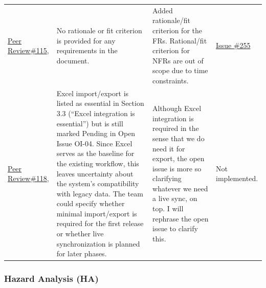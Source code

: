 \documentclass{article}
\begin{document}
\begin{longtable}{p{} p{}
                    p{} p{}}
    \href{https://github.com/thaafei/DomainX/issues/115}{Peer Review\#115},
    &
    No rationale or fit criterion is provided for any requirements in the document.
    &
    Added rationale/fit criterion for the FRs. Rational/fit criterion for NFRs are out of scope due to time constraints.
    &
    \href{https://github.com/thaafei/DomainX/issues/255}{Issue \#255} \\

    \href{https://github.com/thaafei/DomainX/issues/118}{Peer Review\#118},
    &
    Excel import/export is listed as essential in Section 3.3 (“Excel integration is essential”) but is still marked Pending in Open Issue OI-04. Since Excel serves as the baseline for the existing workflow, this leaves uncertainty about the system’s compatibility with legacy data. The team could specify whether minimal import/export is required for the first release or whether live synchronization is planned for later phases.    &
    Although Excel integration is required in the sense that we do need it for export, the open issue is more so clarifying whatever we need a live sync, on top. I will rephrase the open issue to clarify this.
    &
    Not implemented.
    \\


    \end{longtable}

\subsubsection{Hazard Analysis (HA)}
\end{document}
